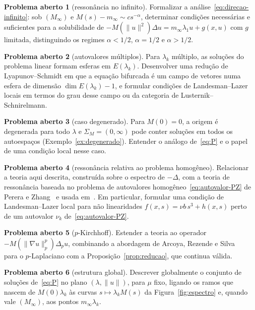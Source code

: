 \documentclass[11pt,a4paper]{article}
\theoremstyle{plain}
\theoremstyle{definition}
\newtheorem{problema}{Problema aberto}
\theoremstyle{remark}
\newcommand{\norm}[1]{\lVert #1\rVert}
\begin{document}
\begin{problema}[ressonância no infinito]
Formalizar a análise~\eqref{eq:direcao-infinito}: sob $(M_\infty)$ e
$M(s)-m_\infty\sim cs^{-\alpha}$, determinar condições necessárias e
suficientes para a solubilidade de $-M(\norm{u}^2)\Delta u=m_\infty\lambda_1u+g(x,u)$
com $g$ limitada, distinguindo os regimes $\alpha<1/2$, $\alpha=1/2$ e
$\alpha>1/2$.
\end{problema}

\begin{problema}[autovalores múltiplos]
Para $\lambda_k$ múltiplo, as soluções do problema linear formam esferas em
$E(\lambda_k)$. Desenvolver uma redução de Lyapunov--Schmidt em que a equação
bifurcada é um campo de vetores numa esfera de dimensão $\dim E(\lambda_k)-1$,
e formular condições de Landesman--Lazer locais em termos do grau desse campo
ou da categoria de Lusternik--Schnirelmann.
\end{problema}

\begin{problema}[caso degenerado]
Para $M(0)=0$, a origem é degenerada para todo $\lambda$ e
$\Sigma_M=(0,\infty)$ pode conter soluções em todos os autoespaços
(Exemplo~\ref{ex:degenerado}). Entender o análogo de~\eqref{eq:P} e o papel de uma condição local
nesse caso.
\end{problema}

\begin{problema}[ressonância relativa ao problema homogêneo]
Relacionar a teoria aqui descrita, construída sobre o espectro de $-\Delta$,
com a teoria de ressonância baseada no problema de autovalores
homogêneo~\eqref{eq:autovalor-PZ} de Perera e Zhang~\cite{PereraZhang2006} e
usada em~\cite{SunTang2013,SongTangChen2015}. Em particular, formular uma
condição de Landesman--Lazer local para não linearidades
$f(x,s)=\nu b\,s^3+h(x,s)$ perto de um autovalor $\nu_k$
de~\eqref{eq:autovalor-PZ}.
\end{problema}

\begin{problema}[$p$-Kirchhoff]
Estender a teoria ao operador $-M(\norm{\nabla u}_p^p)\Delta_pu$, combinando a
abordagem de Arcoya, Rezende e Silva~\cite{ArcoyaRezendeSilva2019} para o
$p$-Laplaciano com a Proposição~\ref{prop:reducao}, que continua válida.
\end{problema}

\begin{problema}[estrutura global]
Descrever globalmente o conjunto de soluções de~\eqref{eq:P} no plano
$(\lambda,\norm{u})$, para $\mu$ fixo, ligando os ramos que nascem de
$M(0)\lambda_k$ às curvas $s\mapsto\lambda_kM(s)$ da Figura~\ref{fig:espectro}
e, quando vale $(M_\infty)$, aos pontos $m_\infty\lambda_k$.
\end{problema}
\end{document}
